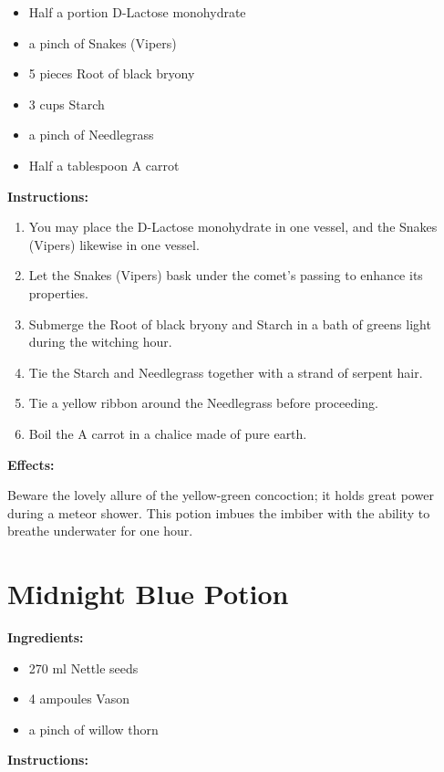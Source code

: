 \documentclass{article}
\begin{document}
\begin{itemize}
  \item Half a portion D-Lactose monohydrate
  \item a pinch of Snakes (Vipers)
  \item 5 pieces Root of black bryony
  \item 3 cups Starch
  \item a pinch of Needlegrass
  \item Half a tablespoon A carrot
\end{itemize}

\textbf{Instructions:}

\begin{enumerate}
  \item You may place the D-Lactose monohydrate in one vessel, and the Snakes (Vipers) likewise in one vessel.
  \item Let the Snakes (Vipers) bask under the comet’s passing to enhance its properties.
  \item Submerge the Root of black bryony and Starch in a bath of greens light during the witching hour.
  \item Tie the Starch and Needlegrass together with a strand of serpent hair.
  \item Tie a yellow ribbon around the Needlegrass before proceeding.
  \item Boil the A carrot in a chalice made of pure earth.
\end{enumerate}

\textbf{Effects:}

Beware the lovely allure of the yellow-green concoction; it holds great power during a meteor shower. This potion imbues the imbiber with the ability to breathe underwater for one hour.

\newpage
\section*{Midnight Blue Potion}

\textbf{Ingredients:}

\begin{itemize}
  \item 270 ml Nettle seeds
  \item 4 ampoules Vason
  \item a pinch of willow thorn
\end{itemize}

\textbf{Instructions:}
\end{document}
